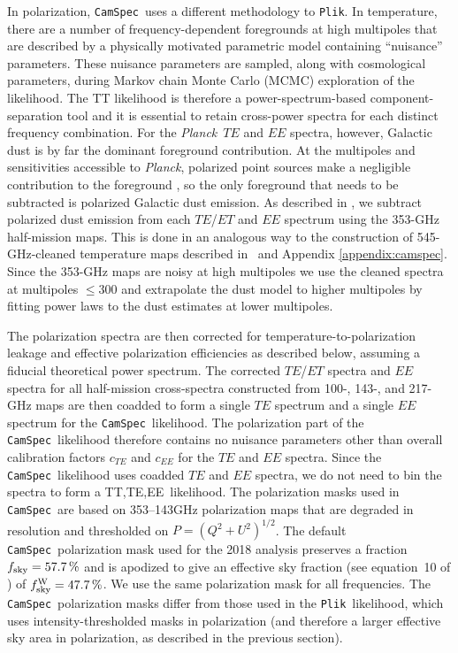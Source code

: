 \documentclass[longauth,traditabstract]{aa}
\def\Planck{\textit{Planck}}
\def\,{\thinspace}
\newcommand{\camspec}{{\tt CamSpec}}
\newcommand{\plik}{{\tt Plik}}
\newcommand{\mksym}[1]{\ifmmode {\rm #1}\else #1\fi}
\newcommand{\TTTEEE}{\mksym{TT,TE,EE}}
\newcommand{\paramsII}{\citetalias{planck2014-a15}}
\newcommand{\planck}{\Planck}
\begin{document}
In polarization, \camspec\ uses a different methodology to \plik. In
temperature, there are a number of frequency-dependent foregrounds at
high multipoles that are described by a physically motivated parametric model containing
``nuisance'' parameters.  These nuisance parameters are
sampled, along with cosmological parameters, during Markov chain Monte
Carlo (MCMC) exploration
of the likelihood.  The TT likelihood is therefore a power-spectrum-based
component-separation tool and it is essential to retain
cross-power spectra for each distinct frequency combination. For the
\Planck\ $TE$ and $EE$ spectra, however, Galactic dust is by far the dominant
foreground contribution. At the multipoles and sensitivities
accessible to \planck, polarized point sources make a negligible
contribution to the foreground \citep[as verified by ACTPol and
SPTpol;][]{Louis2016, Henning2017}, so the only foreground that
needs to be subtracted is polarized Galactic dust emission. As
described in \paramsII, we subtract polarized dust emission from each $TE$/$ET$
and $EE$ spectrum using the 353-GHz half-mission maps. This is done in
an analogous way to the construction of 545-GHz-cleaned temperature
maps described in \paramsII\ and Appendix \ref{appendix:camspec}.
Since the 353-GHz maps are
noisy at high multipoles we use the cleaned spectra at multipoles
$\le 300$ and extrapolate the dust model to higher multipoles by
fitting power laws to the dust estimates at lower multipoles.

The polarization spectra are then corrected for temperature-to-polarization
leakage and effective polarization efficiencies as described below,
assuming a fiducial theoretical power spectrum.  The corrected $TE$/$ET$ spectra and $EE$
spectra for all half-mission cross-spectra constructed from 100-,
143-, and 217-GHz maps are then coadded to form a single $TE$ spectrum
and a single $EE$ spectrum for the \camspec\ likelihood. The
polarization part of the \camspec\ likelihood therefore contains no
nuisance parameters other than overall calibration factors $c_{TE}$
and $c_{EE}$ for the $TE$ and $EE$ spectra. Since the \camspec\ likelihood uses coadded $TE$ and $EE$ spectra,
we do not need to bin the spectra to form a \TTTEEE\ likelihood. 
The polarization masks used in \camspec\ are based on 353--143\,GHz polarization maps that are
degraded in resolution and thresholded on $P=(Q^2 +U^2)^{1/2}$.  
The default \camspec\ polarization mask used for the 2018 analysis
preserves a fraction $f_{\rm sky}=57.7\,\%$ and is apodized to give an effective
sky fraction (see equation~10 of \paramsII) of $f^{\rm W}_{\rm sky} = 47.7\,\%$. We use the same
polarization mask for all frequencies. The \camspec\ polarization masks differ from 
those used in the \plik\ likelihood, which uses intensity-thresholded masks in polarization
(and therefore a larger effective sky area in polarization, as described in the previous section).
\end{document}
